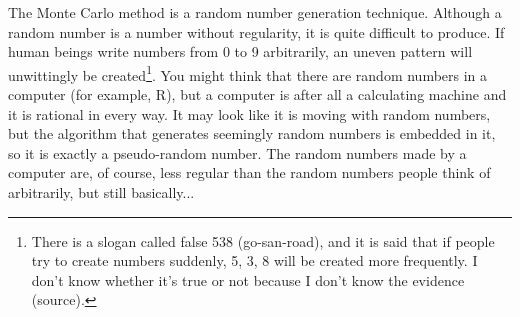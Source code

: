 \documentclass{ltjsbook}
\begin{document}
The Monte Carlo method is a random number generation technique. Although a random number is a number without regularity, it is quite difficult to produce. If human beings write numbers from 0 to 9 arbitrarily, an uneven pattern will unwittingly be created\footnote{There is a slogan called false 538 (go-san-road), and it is said that if people try to create numbers suddenly, 5, 3, 8 will be created more frequently. I don't know whether it's true or not because I don't know the evidence (source).}. You might think that there are random numbers in a computer (for example, R), but a computer is after all a calculating machine and it is rational in every way. It may look like it is moving with random numbers, but the algorithm that generates seemingly random numbers is embedded in it, so it is exactly a pseudo-random number. The random numbers made by a computer are, of course, less regular than the random numbers people think of arbitrarily, but still basically...

\end{document}
